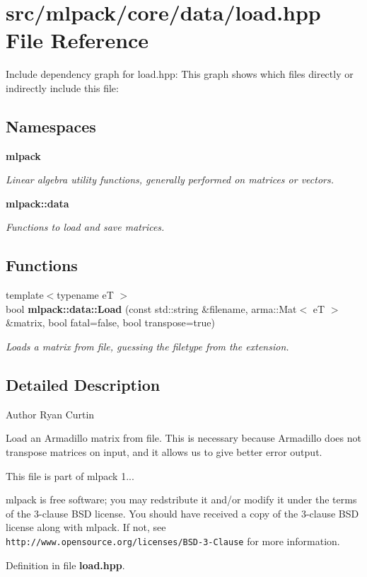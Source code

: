 \section{src/mlpack/core/data/load.hpp File Reference}
\label{load_8hpp}
Include dependency graph for load.\-hpp\-:
This graph shows which files directly or indirectly include this file\-:
\subsection*{Namespaces}
\begin{DoxyCompactItemize}
\item 
{\bf mlpack}
\begin{DoxyCompactList}\small\item\em Linear algebra utility functions, generally performed on matrices or vectors. \end{DoxyCompactList}\item 
{\bf mlpack\-::data}
\begin{DoxyCompactList}\small\item\em Functions to load and save matrices. \end{DoxyCompactList}\end{DoxyCompactItemize}
\subsection*{Functions}
\begin{DoxyCompactItemize}
\item 
{\footnotesize template$<$typename e\-T $>$ }\\bool {\bf mlpack\-::data\-::\-Load} (const std\-::string \&filename, arma\-::\-Mat$<$ e\-T $>$ \&matrix, bool fatal=false, bool transpose=true)
\begin{DoxyCompactList}\small\item\em Loads a matrix from file, guessing the filetype from the extension. \end{DoxyCompactList}\end{DoxyCompactItemize}


\subsection{Detailed Description}
\begin{DoxyAuthor}{Author}
Ryan Curtin
\end{DoxyAuthor}
Load an Armadillo matrix from file. This is necessary because Armadillo does not transpose matrices on input, and it allows us to give better error output.

This file is part of mlpack 1...

mlpack is free software; you may redstribute it and/or modify it under the terms of the 3-\/clause B\-S\-D license. You should have received a copy of the 3-\/clause B\-S\-D license along with mlpack. If not, see {\tt http\-://www.\-opensource.\-org/licenses/\-B\-S\-D-\/3-\/\-Clause} for more information. 

Definition in file {\bf load.\-hpp}.

